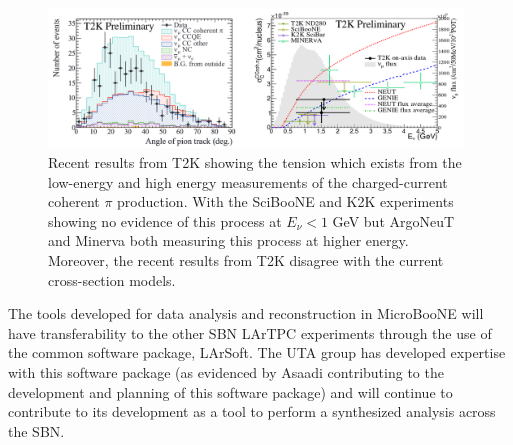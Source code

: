 \begin{figure}[htb]
\centering
\includegraphics[width=0.98\textwidth]{images/CCCohPion.png}
\caption[]{Recent results from T2K \cite{} showing the tension which exists from the low-energy and high energy measurements of the charged-current coherent $\pi$ production. With the SciBooNE and K2K experiments showing no evidence of this process at $E_{\nu} < 1$ GeV but ArgoNeuT and Minerva both measuring this process at higher energy. Moreover, the recent results from T2K disagree with the current cross-section models.}
\label{fig:cccohpion}
\end{figure}


The tools developed for data analysis and reconstruction in MicroBooNE will have transferability to the other SBN LArTPC experiments through the use of the common software package, LArSoft. The UTA group has developed expertise with this software package (as evidenced by Asaadi contributing to the development and planning of this software package) and will continue to contribute to its development as a tool to perform a synthesized analysis across the SBN.
